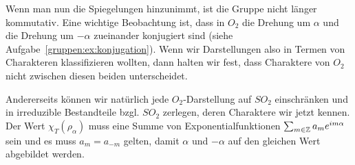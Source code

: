 \begin{remark}
Wenn man nun die Spiegelungen hinzunimmt, ist die Gruppe nicht länger kommutativ. Eine wichtige Beobachtung ist, dass in $O_2$ die Drehung um $\alpha$ und die Drehung um $-\alpha$ zueinander konjugiert sind (siehe Aufgabe~\ref{gruppen:ex:konjugation}). Wenn wir Darstellungen also in Termen von Charakteren klassifizieren wollten, dann halten wir fest, dass Charaktere von $O_2$ nicht zwischen diesen beiden unterscheidet.

Andererseits können wir natürlich jede $O_2$-Darstellung auf $SO_2$ einschränken und in irreduzible Bestandteile bzgl. $SO_2$ zerlegen, deren Charaktere wir jetzt kennen. Der Wert $\chi_T(\rho_\alpha)$ muss eine Summe von Exponentialfunktionen $\sum_{m\in\mathbb{Z}} a_m e^{im\alpha}$ sein und es muss $a_m=a_{-m}$ gelten, damit $\alpha$ und $-\alpha$ auf den gleichen Wert abgebildet werden.
\end{remark}

